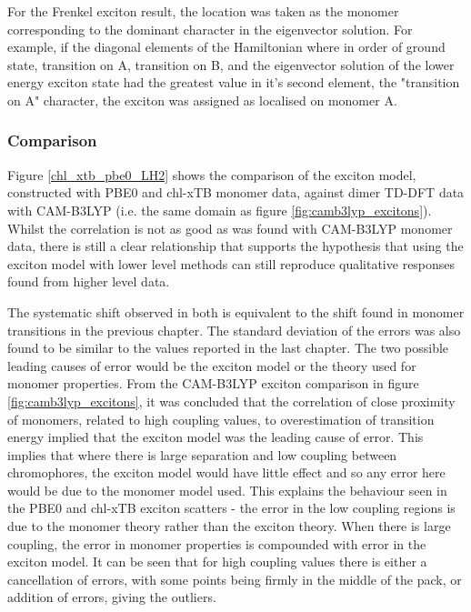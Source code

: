For the Frenkel exciton result, the location was taken as the monomer corresponding
to the dominant character in the eigenvector solution. For example, if the diagonal
elements of the Hamiltonian where in order of ground state, transition on A, transition
on B, and the eigenvector solution of the lower energy exciton state had the greatest
value in it's second element, the "transition on A" character, the exciton was assigned
as localised on monomer A.

\subsubsection{Comparison}
\label{subsec:state_assign}

Figure \ref{chl_xtb_pbe0_LH2} shows the comparison of the exciton model, constructed
with PBE0 and chl-xTB monomer data, against dimer TD-DFT data with CAM-B3LYP (i.e.
the same domain as figure \ref{fig:camb3lyp_excitons}). Whilst the correlation is 
not as good as was found with CAM-B3LYP monomer data, there is still a clear relationship 
that supports the hypothesis that using the exciton model with lower level methods 
can still reproduce qualitative responses found from higher level data.

The systematic shift observed in both is equivalent to the shift found in monomer
transitions in the previous chapter. The standard deviation of the errors was also
found to be similar to the values reported in the last chapter.
The two possible leading causes of error would be the exciton model or the theory 
used for monomer properties. From the CAM-B3LYP exciton comparison in figure \ref{fig:camb3lyp_excitons},
it was concluded that the correlation of close proximity of monomers, related to 
high coupling values, to overestimation of transition energy implied that the exciton
model was the leading cause of error. This implies that where there is large separation
and low coupling between chromophores, the exciton model would have little effect
and so any error here would be due to the monomer model used. This explains the 
behaviour seen in the PBE0 and chl-xTB exciton scatters - the error in the low coupling
regions is due to the monomer theory rather than the exciton theory. When there is 
large coupling, the error in monomer properties is compounded with error in the
exciton model. It can be seen that for high coupling values there is either a cancellation
of errors, with some points being firmly in the middle of the pack, or addition 
of errors, giving the outliers.

